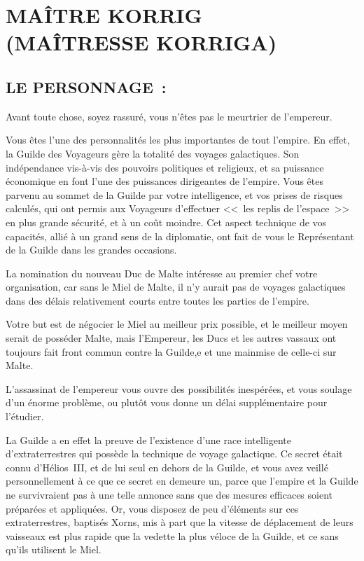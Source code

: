 \documentclass[14pt,twocolumn]{extarticle}
\begin{document}
\section{MAÎTRE KORRIG\\(MAÎTRESSE KORRIGA)}

\subsection{LE PERSONNAGE~:}

Avant toute chose, soyez rassuré, vous n'êtes pas le meurtrier de l'empereur.

Vous êtes l'une des personnalités les plus importantes de tout l'empire. En
effet, la Guilde des Voyageurs gère la totalité des voyages galactiques. Son
indépendance vis-à-vis des pouvoirs politiques et religieux, et sa puissance
économique en font l'une des puissances dirigeantes de l'empire. Vous êtes
parvenu au sommet de la Guilde par votre intelligence, et vos prises de risques
calculés, qui ont permis aux Voyageurs d'effectuer <<~les replis de l'espace~>>
en plus grande sécurité, et à un coût moindre. Cet aspect technique de vos
capacités, allié à un grand sens de la diplomatie, ont fait de vous le
Représentant de la Guilde dans les grandes occasions.

La nomination du nouveau Duc de Malte intéresse au premier chef votre
organisation, car sans le Miel de Malte, il n'y aurait pas de voyages
galactiques dans des délais relativement courts entre toutes les parties de
l'empire.

Votre but est de négocier le Miel au meilleur prix possible, et le meilleur
moyen serait de posséder Malte, mais l'Empereur, les Ducs et les autres vassaux
ont toujours fait front commun contre la Guilde,e et une mainmise de celle-ci
sur Malte.

L'assassinat de l'empereur vous ouvre des possibilités inespérées, et vous
soulage d'un énorme problème, ou plutôt vous donne un délai supplémentaire pour
l'étudier.

La Guilde a en effet la preuve de l'existence d'une race intelligente
d'extraterrestres qui possède la technique de voyage galactique. Ce secret
était connu d'Hélios~III, et de lui seul en dehors de la Guilde, et vous avez
veillé personnellement à ce que ce secret en demeure un, parce que l'empire et
la Guilde ne survivraient pas à une telle annonce sans que des mesures
efficaces soient préparées et appliquées. Or, vous disposez de peu d'éléments
sur ces extraterrestres, baptisés Xorns, mis à part que la vitesse de
déplacement de leurs vaisseaux est plus rapide que la vedette la plus véloce de
la Guilde, et ce sans qu'ils utilisent le Miel.
\end{document}
